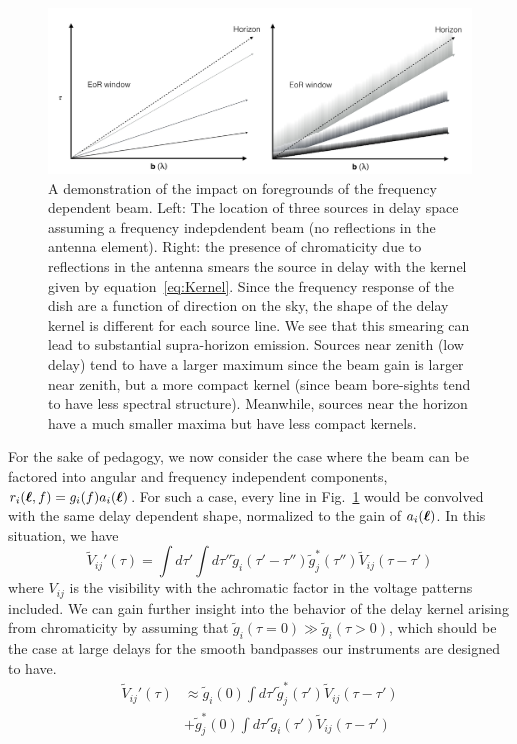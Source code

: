 \documentclass[twocolumn]{emulateapj}
\begin{document}
\begin{figure}
\includegraphics[width=\textwidth]{figures/wedgeCompare.pdf}
\caption{A demonstration of the impact on foregrounds of the frequency dependent beam. Left: The location of three sources in delay space assuming a frequency indepdendent beam (no reflections in the antenna element). Right: the presence of chromaticity due to reflections in the antenna smears the source in delay with the kernel given by equation~\ref{eq:Kernel}. Since the frequency response of the dish are a function of direction on the sky, the shape of the delay kernel is different for each source line. We see that this smearing can lead to substantial supra-horizon emission. Sources near zenith (low delay) tend to have a larger maximum since the beam gain is larger near zenith, but a more compact kernel (since beam bore-sights tend to have less spectral structure). Meanwhile, sources near the horizon have a much smaller maxima but have less compact kernels.}
\label{fig:Smearing}
\end{figure}
For the sake of pedagogy, we now consider the case where the beam can be factored into angular and frequency independent components, $r_i(\boldsymbol{\ell},f) = g_i(f)a_i(\boldsymbol{\ell})$. For such a case, every line in Fig.~\ref{fig:Smearing} would be convolved with the same delay dependent shape, normalized to the gain of $a_i(\boldsymbol{\ell})$. In this situation, we have
\begin{equation}
\widetilde{V}_{ij}'(\tau) = \int d\tau' \int d \tau'' \widetilde{g}_i(\tau' - \tau'')\widetilde{g}^*_j(\tau'') \widetilde{V}_{ij}(\tau-\tau')
\end{equation}
where $V_{ij}$ is the visibility with the achromatic factor in the voltage patterns included. 
We can gain further insight into the behavior of the delay kernel arising from chromaticity by assuming that $\widetilde{g}_i(\tau=0)\gg\widetilde{g}_i(\tau>0)$, which should be the case at large delays for the smooth bandpasses our instruments are designed to have. 
\begin{align}\label{eq:KernelApprox}
\widetilde{V}_{ij}'(\tau) &\approx \widetilde{g}_i(0)\int d \tau' \widetilde{g}_j^*(\tau')\widetilde{V}_{ij}(\tau- \tau') \nonumber \\
& + \widetilde{g}_j^*(0) \int d \tau' \widetilde{g}_i(\tau')\widetilde{V}_{ij}(\tau-\tau') 
\end{align}
\end{document}
